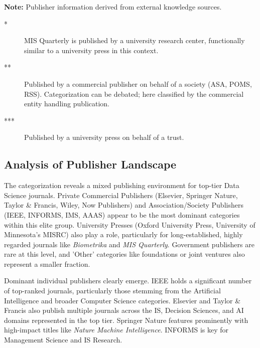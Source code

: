 \documentclass[../main.tex]{subfiles}
\begin{document}
\footnotesize {\textbf{Note:} Publisher information derived from external knowledge sources.

\begin{description}
    \item[*] MIS Quarterly is published by a university research center, functionally similar to a university press in this context.
    \item[**] Published by a commercial publisher on behalf of a society (ASA, POMS, RSS).
    Categorization can be debated; here classified by the commercial entity handling publication.
    \item[***] Published by a university press on behalf of a trust.
\end{description}}

\subsection{Analysis of Publisher Landscape}

\vspace{0.2cm}
\noindent
The categorization reveals a mixed publishing environment for top-tier Data Science journals. Private Commercial Publishers (Elsevier, Springer Nature, Taylor \& Francis, Wiley, Now Publishers) and Association/Society Publishers (IEEE, INFORMS, IMS, AAAS) appear to be the most dominant categories within this elite group. University Presses (Oxford University Press, University of Minnesota's MISRC) also play a role, particularly for long-established, highly regarded journals like \textit{Biometrika} and \textit{MIS Quarterly}. Government publishers are rare at this level, and 'Other' categories like foundations or joint ventures also represent a smaller fraction.

\vspace{0.2cm}
\noindent
Dominant individual publishers clearly emerge. IEEE holds a significant number of top-ranked journals, particularly those stemming from the Artificial Intelligence and broader Computer Science categories. Elsevier and Taylor \& Francis also publish multiple journals across the IS, Decision Sciences, and AI domains represented in the top tier. Springer Nature features prominently with high-impact titles like \textit{Nature Machine Intelligence}. INFORMS is key for Management Science and IS Research.
\end{document}
